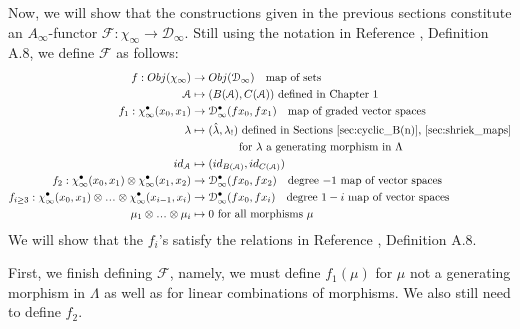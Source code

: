 Now, we will show that the constructions 
given in the previous sections constitute 
an $A_\infty$-functor $\mathcal{F}: 
\chi_\infty \to \mathcal{D}_\infty$. Still using 
the notation in Reference \cite{F}, 
Definition A.8, we define $\mathcal{F}$ 
as follows:
\begin{align*}
f: Obj(\chi_\infty) 
&\to 
Obj(\mathcal{D}_\infty)
\quad \textrm{map of sets}\\
\mathcal{A}
&\mapsto
(B(\mathcal{A}), C(\mathcal{A}))
\textrm{ defined in Chapter 1}\\
%
f_1: \chi_\infty^\bullet(x_0, x_1)
&\to
\mathcal{D}_\infty^\bullet(fx_0, fx_1)
\quad \textrm{map of graded vector spaces}\\
\lambda
&\mapsto 
(\hat{\lambda}, \lambda_!)
\textrm{ defined in Sections \ref{sec:cyclic_B(n)}, \ref{sec:shriek_maps}}\\
&\phantom{{}moveover{}}
  \textrm{for $\lambda$ a generating morphism in $\Lambda$}\\
id_{\mathcal{A}}
&\mapsto
(id_{B(\mathcal{A})}, id_{C(\mathcal{A})})\\
%  
f_2: \chi_\infty^\bullet(x_0, x_1)
  \otimes \chi_\infty^\bullet(x_1, x_2)
&\to
\mathcal{D}_\infty^\bullet(fx_0, fx_2)
\quad \textrm{degree $-1$ map of vector spaces}\\
%
f_{i\geq 3}: \chi_\infty^\bullet(x_0, x_1)
  \otimes \smdots \otimes 
  \chi_\infty^\bullet(x_{i-1}, x_i)
&\to 
\mathcal{D}_\infty^\bullet(fx_0, fx_i)
\quad \textrm{degree $1-i$ map of vector spaces}\\
\mu_1 \otimes \smdots \otimes \mu_i
&\mapsto
0 \textrm{ for all morphisms $\mu$}
\end{align*}
We will show that the $f_i$'s satisfy 
the relations in Reference \cite{F}, 
Definition A.8.

First, we finish defining $\mathcal{F}$, 
namely, we must define $f_1(\mu)$ for 
$\mu$ not a generating morphism in $\Lambda$ 
as well as for linear combinations of 
morphisms. We also still need to define $f_2$.


